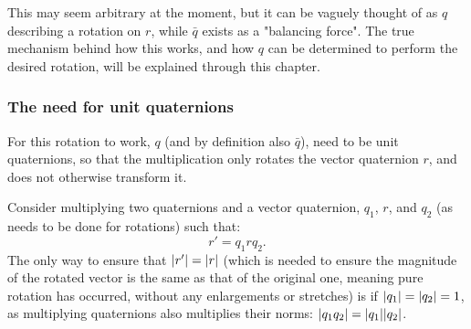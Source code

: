 \documentclass[10pt]{article}
\begin{document}
This may seem arbitrary at the moment, but it can be vaguely thought of as $q$ describing a rotation on $r$, while $\bar{q}$ exists as a "balancing force". The true mechanism behind how this works, and how $q$ can be determined to perform the desired rotation, will be explained through this chapter.

\subsubsection{The need for unit quaternions} \label{NormMultProof}

For this rotation to work, $q$ (and by definition also $\bar{q}$), need to be unit quaternions, so that the multiplication only rotates the vector quaternion $r$, and does not otherwise transform it.

Consider multiplying two quaternions and a vector quaternion, $q_1$, $r$, and $q_2$ (as needs to be done for rotations) such that:
\begin{equation}
    r' = q_1rq_2.
\end{equation}
The only way to ensure that $\abs{r'} = \abs{r}$ (which is needed to ensure the magnitude of the rotated vector is the same as that of the original one, meaning pure rotation has occurred, without any enlargements or stretches) is if $\abs{q_1} = \abs{q_2} = 1$, as multiplying quaternions also multiplies their norms: $\abs{q_1q_2} = \abs{q_1}\abs{q_2}$.
\end{document}
